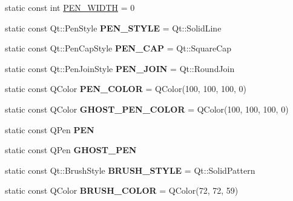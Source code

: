 \begin{DoxyCompactItemize}
\item 
static const int \hyperlink{classRoadGUI_a998dae57fd63610094da9e39f13c61c1}{P\-E\-N\-\_\-\-W\-I\-D\-T\-H} = 0
\item 
\hypertarget{classRoadGUI_ab9a0928afa237bd89691076633cf2991}{static const Qt\-::\-Pen\-Style {\bfseries P\-E\-N\-\_\-\-S\-T\-Y\-L\-E} = Qt\-::\-Solid\-Line}\label{classRoadGUI_ab9a0928afa237bd89691076633cf2991}

\item 
\hypertarget{classRoadGUI_a9ebf1722a441634ecb875611ac4a67f1}{static const Qt\-::\-Pen\-Cap\-Style {\bfseries P\-E\-N\-\_\-\-C\-A\-P} = Qt\-::\-Square\-Cap}\label{classRoadGUI_a9ebf1722a441634ecb875611ac4a67f1}

\item 
\hypertarget{classRoadGUI_aaa2a0fb2b5e6a0222428eb2fab48ea20}{static const Qt\-::\-Pen\-Join\-Style {\bfseries P\-E\-N\-\_\-\-J\-O\-I\-N} = Qt\-::\-Round\-Join}\label{classRoadGUI_aaa2a0fb2b5e6a0222428eb2fab48ea20}

\item 
\hypertarget{classRoadGUI_a2d69709533ad02ce74400b7354bc7b20}{static const Q\-Color {\bfseries P\-E\-N\-\_\-\-C\-O\-L\-O\-R} = Q\-Color(100, 100, 100, 0)}\label{classRoadGUI_a2d69709533ad02ce74400b7354bc7b20}

\item 
\hypertarget{classRoadGUI_afcae87f471384ff5ed4b9539b3e42e0d}{static const Q\-Color {\bfseries G\-H\-O\-S\-T\-\_\-\-P\-E\-N\-\_\-\-C\-O\-L\-O\-R} = Q\-Color(100, 100, 100, 0)}\label{classRoadGUI_afcae87f471384ff5ed4b9539b3e42e0d}

\item 
\hypertarget{classRoadGUI_aaad4b7b5899c833fe78c60a7583ccbfc}{static const Q\-Pen {\bfseries P\-E\-N}}\label{classRoadGUI_aaad4b7b5899c833fe78c60a7583ccbfc}

\item 
\hypertarget{classRoadGUI_a967cb8f74565726887990dc748fca996}{static const Q\-Pen {\bfseries G\-H\-O\-S\-T\-\_\-\-P\-E\-N}}\label{classRoadGUI_a967cb8f74565726887990dc748fca996}

\item 
\hypertarget{classRoadGUI_a53dc510ed73ce2310670ba56a60387d9}{static const Qt\-::\-Brush\-Style {\bfseries B\-R\-U\-S\-H\-\_\-\-S\-T\-Y\-L\-E} = Qt\-::\-Solid\-Pattern}\label{classRoadGUI_a53dc510ed73ce2310670ba56a60387d9}

\item 
\hypertarget{classRoadGUI_aab9d1e45204227a7deb5be52f8f2a698}{static const Q\-Color {\bfseries B\-R\-U\-S\-H\-\_\-\-C\-O\-L\-O\-R} = Q\-Color(72, 72, 59)}\label{classRoadGUI_aab9d1e45204227a7deb5be52f8f2a698}


\end{DoxyCompactItemize}
